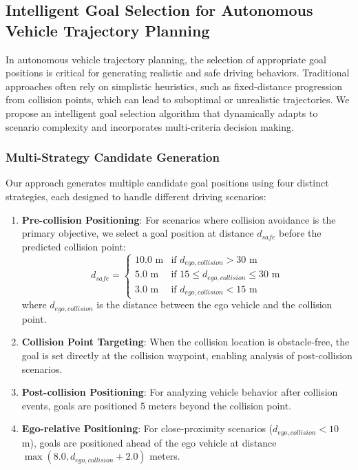 \subsection{Intelligent Goal Selection for Autonomous Vehicle Trajectory Planning}

In autonomous vehicle trajectory planning, the selection of appropriate goal positions is critical for generating realistic and safe driving behaviors. Traditional approaches often rely on simplistic heuristics, such as fixed-distance progression from collision points, which can lead to suboptimal or unrealistic trajectories. We propose an intelligent goal selection algorithm that dynamically adapts to scenario complexity and incorporates multi-criteria decision making.

\subsubsection{Multi-Strategy Candidate Generation}

Our approach generates multiple candidate goal positions using four distinct strategies, each designed to handle different driving scenarios:

\begin{enumerate}
    \item \textbf{Pre-collision Positioning}: For scenarios where collision avoidance is the primary objective, we select a goal position at distance $d_{safe}$ before the predicted collision point:
    \begin{equation}
        d_{safe} = \begin{cases}
            10.0 \text{ m} & \text{if } d_{ego,collision} > 30 \text{ m} \\
            5.0 \text{ m} & \text{if } 15 \leq d_{ego,collision} \leq 30 \text{ m} \\
            3.0 \text{ m} & \text{if } d_{ego,collision} < 15 \text{ m}
        \end{cases}
    \end{equation}
    where $d_{ego,collision}$ is the distance between the ego vehicle and the collision point.
    
    \item \textbf{Collision Point Targeting}: When the collision location is obstacle-free, the goal is set directly at the collision waypoint, enabling analysis of post-collision scenarios.
    
    \item \textbf{Post-collision Positioning}: For analyzing vehicle behavior after collision events, goals are positioned 5 meters beyond the collision point.
    
    \item \textbf{Ego-relative Positioning}: For close-proximity scenarios ($d_{ego,collision} < 10$ m), goals are positioned ahead of the ego vehicle at distance $\max(8.0, d_{ego,collision} + 2.0)$ meters.
\end{enumerate}

